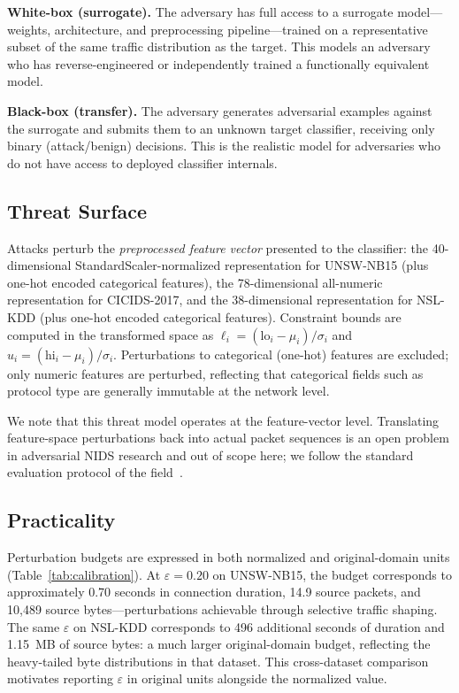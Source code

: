 \documentclass[sigconf,anonymous=true]{acmart}
\begin{document}
\textbf{White-box (surrogate).}
The adversary has full access to a surrogate model---weights,
architecture, and preprocessing pipeline---trained on a representative
subset of the same traffic distribution as the target.  This models an
adversary who has reverse-engineered or independently trained a
functionally equivalent model.

\textbf{Black-box (transfer).}
The adversary generates adversarial examples against the surrogate and
submits them to an unknown target classifier, receiving only binary
(attack/benign) decisions.  This is the realistic model for adversaries
who do not have access to deployed classifier internals.

\subsection{Threat Surface}

Attacks perturb the \emph{preprocessed feature vector} presented to the
classifier: the 40-dimensional StandardScaler-normalized representation
for UNSW-NB15 (plus one-hot encoded categorical features), the
78-dimensional all-numeric representation for CICIDS-2017, and the
38-dimensional representation for NSL-KDD (plus one-hot encoded
categorical features).
Constraint bounds are computed in the transformed space as
$\ell_i = (\text{lo}_i - \mu_i)/\sigma_i$ and
$u_i = (\text{hi}_i - \mu_i)/\sigma_i$.
Perturbations to categorical (one-hot) features are excluded; only
numeric features are perturbed, reflecting that categorical fields such
as protocol type are generally immutable at the network level.

We note that this threat model operates at the feature-vector level.
Translating feature-space perturbations back into actual packet sequences
is an open problem in adversarial NIDS research and out of scope here;
we follow the standard evaluation protocol of the
field~\cite{apruzzese2022modeling}.

\subsection{Practicality}

Perturbation budgets are expressed in both normalized and
original-domain units (Table~\ref{tab:calibration}).
At $\varepsilon = 0.20$ on UNSW-NB15, the budget corresponds to
approximately 0.70 seconds in connection duration, 14.9 source
packets, and 10,489 source bytes---perturbations achievable through
selective traffic shaping.
The same $\varepsilon$ on NSL-KDD corresponds to 496 additional
seconds of duration and 1.15~MB of source bytes: a much larger
original-domain budget, reflecting the heavy-tailed byte distributions
in that dataset.
This cross-dataset comparison motivates reporting $\varepsilon$ in
original units alongside the normalized value.
\end{document}
